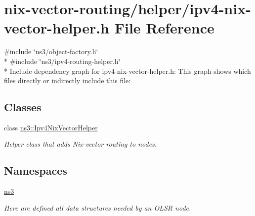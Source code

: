 \hypertarget{ipv4-nix-vector-helper_8h}{}\section{nix-\/vector-\/routing/helper/ipv4-\/nix-\/vector-\/helper.h File Reference}
\label{ipv4-nix-vector-helper_8h}
{\ttfamily \#include \char`\"{}ns3/object-\/factory.\+h\char`\"{}}\\*
{\ttfamily \#include \char`\"{}ns3/ipv4-\/routing-\/helper.\+h\char`\"{}}\\*
Include dependency graph for ipv4-\/nix-\/vector-\/helper.h\+:
This graph shows which files directly or indirectly include this file\+:
\subsection*{Classes}
\begin{DoxyCompactItemize}
\item 
class \hyperlink{classns3_1_1Ipv4NixVectorHelper}{ns3\+::\+Ipv4\+Nix\+Vector\+Helper}
\begin{DoxyCompactList}\small\item\em Helper class that adds Nix-\/vector routing to nodes. \end{DoxyCompactList}\end{DoxyCompactItemize}
\subsection*{Namespaces}
\begin{DoxyCompactItemize}
\item 
 \hyperlink{namespacens3}{ns3}
\begin{DoxyCompactList}\small\item\em Here are defined all data structures needed by an O\+L\+SR node. \end{DoxyCompactList}\end{DoxyCompactItemize}
